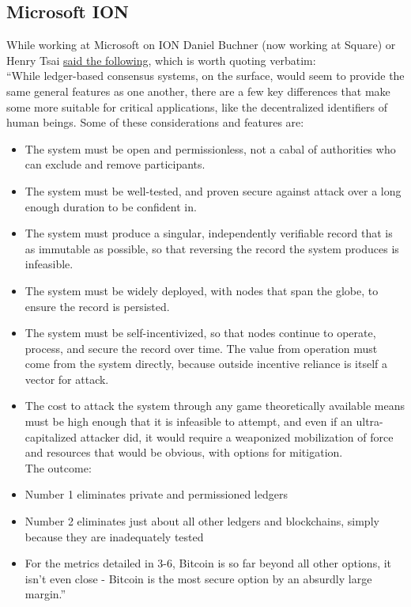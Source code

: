 \subsection{Microsoft ION}
While working at Microsoft on ION Daniel Buchner (now working at Square) or Henry Tsai \href{https://github.com/decentralized-identity/ion/blob/master/docs/Q-and-A.md}{said the following}, which is worth quoting verbatim:\\
``While ledger-based consensus systems, on the surface, would seem to provide the same general features as one another, there are a few key differences that make some more suitable for critical applications, like the decentralized identifiers of human beings. Some of these considerations and features are:
\begin{itemize}
\item The system must be open and permissionless, not a cabal of authorities who can exclude and remove participants.
\item The system must be well-tested, and proven secure against attack over a long enough duration to be confident in.
\item The system must produce a singular, independently verifiable record that is as immutable as possible, so that reversing the record the system produces is infeasible.
\item The system must be widely deployed, with nodes that span the globe, to ensure the record is persisted.
\item The system must be self-incentivized, so that nodes continue to operate, process, and secure the record over time. The value from operation must come from the system directly, because outside incentive reliance is itself a vector for attack.
\item The cost to attack the system through any game theoretically available means must be high enough that it is infeasible to attempt, and even if an ultra-capitalized attacker did, it would require a weaponized mobilization of force and resources that would be obvious, with options for mitigation.\\

The outcome:

\item Number 1 eliminates private and permissioned ledgers
\item Number 2 eliminates just about all other ledgers and blockchains, simply because they are inadequately tested
\item For the metrics detailed in 3-6, Bitcoin is so far beyond all other options, it isn't even close - Bitcoin is the most secure option by an absurdly large margin.''
\end{itemize}

